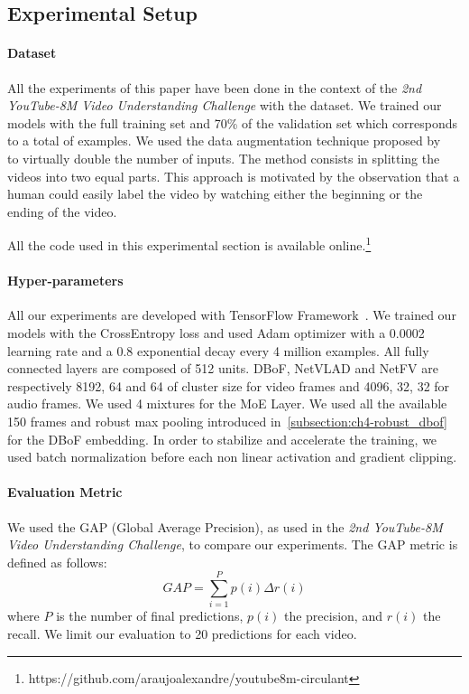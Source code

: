 \subsection{Experimental Setup}

\paragraph{Dataset}
All the experiments of this paper have been done in the context of the \emph{2nd YouTube-8M Video Understanding Challenge} with the \yt dataset.
We trained our models with the full training set and 70\% of the validation set which corresponds to a total of  examples.
We used the data augmentation technique proposed by~\cite{skalic2017deep} to virtually double the number of inputs. 
The method consists in splitting the videos into two equal parts.
This approach is motivated by the observation that a human could easily label the video by watching either the beginning or the ending of the video. 

All the code used in this experimental section is available online.\footnote{https://github.com/araujoalexandre/youtube8m-circulant}

\paragraph{Hyper-parameters}
All our experiments are developed with TensorFlow Framework~\cite{tensorflow2015-whitepaper}.
We trained our models with the CrossEntropy loss and used Adam optimizer with a 0.0002 learning rate and a 0.8 exponential decay every 4 million examples.
All fully connected layers are composed of 512 units.
DBoF, NetVLAD and NetFV are respectively 8192, 64 and 64 of cluster size for video frames and 4096, 32, 32 for audio frames.
We used 4 mixtures for the MoE Layer.
We used all the available 150 frames and robust max pooling introduced in~\ref{subsection:ch4-robust_dbof} for the DBoF embedding.
In order to stabilize and accelerate the training, we used batch normalization before each non linear activation and gradient clipping. 

\paragraph{Evaluation Metric}
We used the GAP (Global Average Precision), as used in the \emph{2nd YouTube-8M Video Understanding Challenge}, to compare our experiments. The GAP metric is defined as follows:
\begin{equation}
  GAP = \sum_{i=1}^{P}p(i) \Delta r(i)
\end{equation}
where $P$ is the number of final predictions, $p(i)$ the precision, and $r(i)$ the recall.
We limit our evaluation to 20 predictions for each video. 

